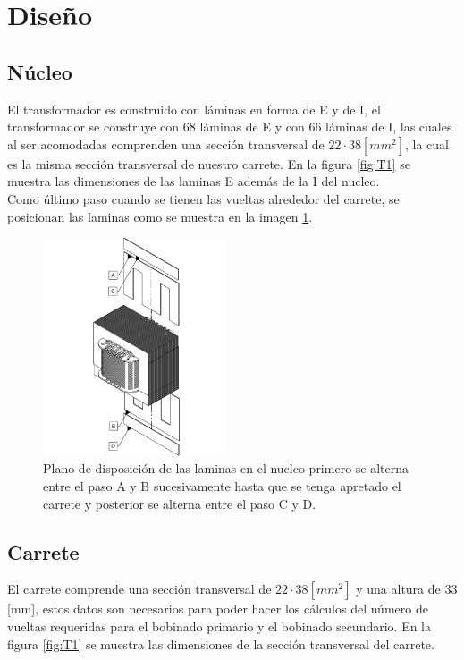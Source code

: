 \section{Diseño}

\subsection{Núcleo}
El transformador es construido con láminas en forma de E y de I, el transformador se construye con 68 láminas de E y con 66 láminas de I, las cuales al ser acomodadas comprenden una sección transversal de $22 \cdot 38 [mm^{2}]$, la cual es la misma sección transversal de nuestro carrete.
En la figura \ref{fig:T1} se muestra las dimensiones de las laminas E además de la I del nucleo.
\\Como último paso cuando se tienen las vueltas alrededor del carrete, se posicionan las laminas como se muestra en la imagen \ref{fig:T2}. 


\begin{figure}[ht!]
    \centering
    \includegraphics[width=0.48\textwidth]{fot/T2.png}
    \caption{Plano de disposición de las laminas en el nucleo primero se alterna entre el paso A y B sucesivamente hasta que se tenga apretado el carrete y posterior se alterna entre el paso C y D.}
    \label{fig:T2}
\end{figure}



\subsection{Carrete}
El carrete comprende una sección transversal de  $22 \cdot 38 [mm^{2}]$ y una altura de 33 [mm], estos datos son necesarios para poder hacer los cálculos del número de vueltas requeridas para el bobinado primario y el bobinado secundario.
En la figura \ref{fig:T1} se muestra las dimensiones de la sección transversal del carrete.


